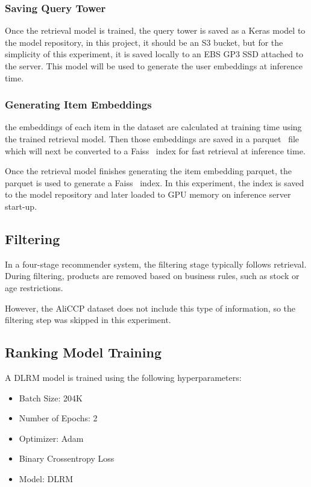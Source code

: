 \subsubsection{Saving Query Tower}

Once the retrieval model is trained, the query tower is saved as a Keras model to the model repository, 
in this project, it should be an S3 bucket, but for the simplicity of this experiment, it is saved locally to an EBS GP3 SSD attached to the server.
This model will be used to generate the user embeddings at inference time.

\subsubsection{Generating Item Embeddings}

the embeddings of each item in the dataset are calculated at training time using the trained retrieval model. 
Then those embeddings are saved in a parquet~\cite{ApacheParquet} file which will next be converted to a Faiss~\cite{Faiss} index for fast retrieval at inference time.

Once the retrieval model finishes generating the item embedding parquet,
the parquet is used to generate a Faiss~\cite{Faiss} index.
In this experiment, the index is saved to the model repository and later loaded to GPU memory on inference server start-up.

\subsection{Filtering}
In a four-stage recommender system, the filtering stage typically follows retrieval.
During filtering, products are removed based on business rules, such as stock or age restrictions. 

However, the AliCCP dataset does not include this type of information, so the filtering step was skipped in this experiment.

\subsection{Ranking Model Training}

A DLRM model is trained using the following hyperparameters:

\begin{itemize}
\item Batch Size: 204K
\item Number of Epochs: 2
\item Optimizer: Adam
\item Binary Crossentropy Loss
\item Model: DLRM
\end{itemize}


